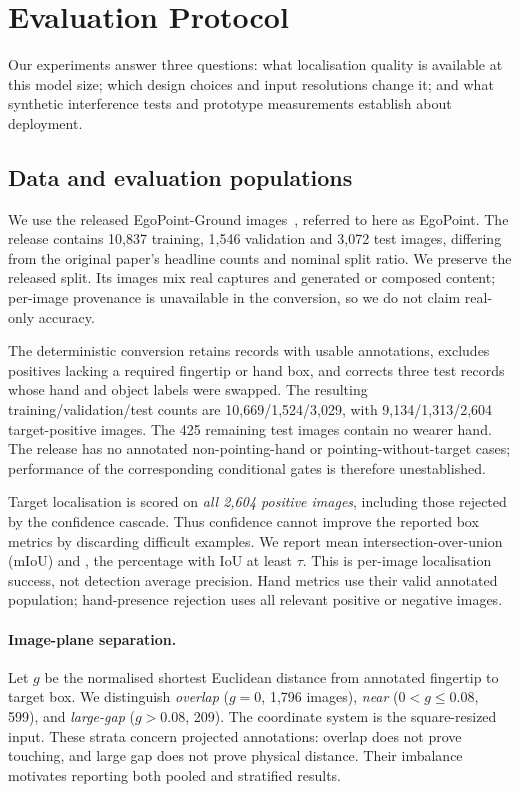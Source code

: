 \section{Evaluation Protocol}\label{sec:protocol}
Our experiments answer three questions: what localisation quality is available at this model size; which design choices and input resolutions change it; and what synthetic interference tests and prototype measurements establish about deployment.

\subsection{Data and evaluation populations}
We use the released EgoPoint-Ground images~\cite{egopoint}, referred to here as EgoPoint. The release contains 10,837 training, 1,546 validation and 3,072 test images, differing from the original paper's headline counts and nominal split ratio. We preserve the released split. Its images mix real captures and generated or composed content; per-image provenance is unavailable in the conversion, so we do not claim real-only accuracy.

The deterministic conversion retains records with usable annotations, excludes positives lacking a required fingertip or hand box, and corrects three test records whose hand and object labels were swapped. The resulting training/validation/test counts are 10,669/1,524/3,029, with 9,134/1,313/2,604 target-positive images. The 425 remaining test images contain no wearer hand. The release has no annotated non-pointing-hand or pointing-without-target cases; performance of the corresponding conditional gates is therefore unestablished.

Target localisation is scored on \emph{all 2,604 positive images}, including those rejected by the confidence cascade. Thus confidence cannot improve the reported box metrics by discarding difficult examples. We report mean intersection-over-union (mIoU) and \pacc{$\tau$}, the percentage with IoU at least $\tau$. This is per-image localisation success, not detection average precision. Hand metrics use their valid annotated population; hand-presence rejection uses all relevant positive or negative images.

\paragraph{Image-plane separation.}
Let $g$ be the normalised shortest Euclidean distance from annotated fingertip to target box. We distinguish \emph{overlap} ($g=0$, 1,796 images), \emph{near} ($0<g\leq0.08$, 599), and \emph{large-gap} ($g>0.08$, 209). The coordinate system is the square-resized input. These strata concern projected annotations: overlap does not prove touching, and large gap does not prove physical distance. Their imbalance motivates reporting both pooled and stratified results.

